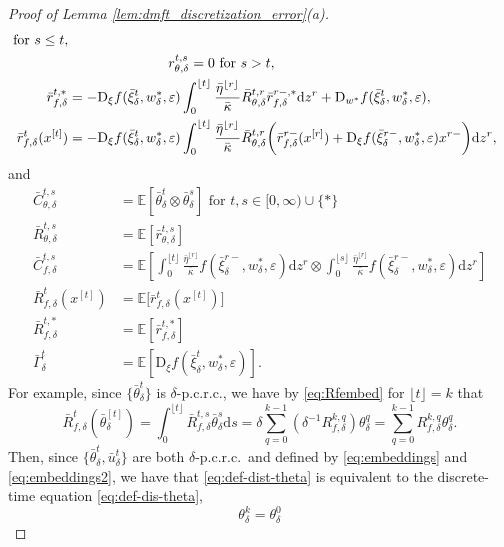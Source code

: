 \documentclass[11pt,letterpaper,reqno]{amsart}
\theoremstyle{definition}
\def\eps{\varepsilon}
\def\d{\mathrm{d}}
\def\D{\mathrm{D}}
\def\E{\mathbb{E}}
\newcommand{\flr}[1]{{\lfloor {#1} \rfloor}}
\newcommand{\brk}[1]{\left[{#1}\right]} %
\begin{document}
\begin{proof}[Proof of Lemma \ref{lem:dmft_discretization_error}(a)]
\begin{align}
\text{ for } s \leq t,\notag\\
&\hspace{1in}r_{\theta,\delta}^{t,s}=0 \text{ for } s>t,
\label{eq:def-dist-deriv-t}\\
\bar r_{f,\delta}^{t,*}&={-}\D_\xi f(\bar\xi^t_\delta,w_\delta^*,\eps) \int_0^{\flr{t}}
\frac{\bar\eta^{\flr{r}}}{\bar\kappa}
\bar R_{\theta,\delta}^{t,r}\bar r_{f,\delta}^{r-,*}\d z^r
+\D_{w^*} f(\bar\xi^t_\delta,w_\delta^*,\eps),\label{eq:def-dist-deriv-xi-star}\\
\bar r_{f,\delta}^t(x^{[t]})&={-}\D_\xi
f(\bar\xi^t_\delta,w_\delta^*,\eps) \int_0^{\flr{t}} \frac{\bar\eta^{\flr{r}}}{\bar\kappa}
\bar R_{\theta,\delta}^{t,r}\bigg(\bar r_{f,\delta}^{r-}(x^{[r]})+\D_\xi
f(\bar\xi^{r-}_\delta,w_\delta^*,\eps)x^{r-}\bigg)\d z^r,\label{eq:def-dist-resp-xi}
\end{align}
and
\begin{align}
\bar C_{\theta,\delta}^{t,s}&=\E[\bar\theta^t_\delta \otimes \bar\theta^s_\delta] \text{ for } t,s \in [0,\infty)
\cup \{*\}\label{eq:def-dist-C-t}\\
\bar R_{\theta,\delta}^{t,s}&=\E[\bar r_{\theta,\delta}^{t,s}]
\label{eq:def-dist-R-t}\\
\bar C_{f,\delta}^{t,s}&=\E\brk{\int_0^{\flr{t}}
\frac{\bar\eta^{\flr{r}}}{\bar\kappa}f(\bar\xi^{r-}_\delta,w_\delta^*,\eps)\d z^r
\otimes \int_0^{\flr{s}}
\frac{\bar\eta^{\flr{r}}}{\bar\kappa}f(\bar\xi^{r-}_\delta,w_\delta^*,\eps)\d z^r}\label{eq:def-dist-C-h}\\
\bar R_{f,\delta}^t(x^{[t]})&=\E\big[\bar r_{f,\delta}^t(x^{[t]})\big]\label{eq:def-dist-R-h}\\
\bar R_{f,\delta}^{t,*}&=\E[\bar r_{f,\delta}^{t,*}]
\label{eq:def-dist-R-h-star}\\
\bar \Gamma^t_\delta&=\E[\D_\xi f(\bar\xi^t_\delta,w_\delta^*,\eps)].\label{eq:def-dist-Gamma}
\end{align}
For example, since $\{\bar\theta_\delta^t\}$ is $\delta$-p.c.r.c., we have
by \eqref{eq:Rfembed} for $\flr{t}=k$ that
\[\bar R_{f,\delta}^t(\bar\theta_\delta^{[t]})
=\int_0^{\flr{t}} \bar R_{f,\delta}^{t,s}\bar\theta_\delta^s\d s
=\delta\sum_{q=0}^{k-1} (\delta^{-1}R_{f,\delta}^{k,q})\theta_\delta^q
=\sum_{q=0}^{k-1} R_{f,\delta}^{k,q} \theta_\delta^q.\]
Then, since $\{\bar\theta_\delta^t,\bar u_\delta^t\}$ are both
$\delta$-p.c.r.c.\ and defined by \eqref{eq:embeddings} and
\eqref{eq:embeddings2}, we have that \eqref{eq:def-dist-theta} is equivalent to
the discrete-time equation \eqref{eq:def-dis-theta},
\[\theta_\delta^k=\theta_\delta^0
\]
\end{proof}
\end{document}

